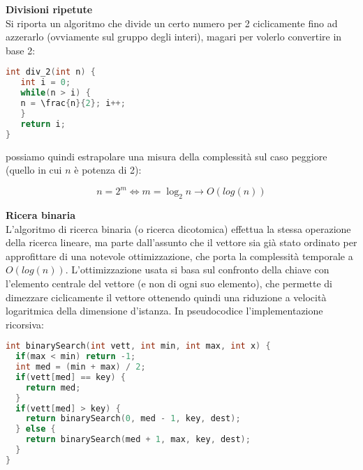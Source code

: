 \documentclass[a4paper,12pt]{article}
\begin{document}
\textbf{Divisioni ripetute} \\
Si riporta un algoritmo che divide un certo numero per 2 ciclicamente fino ad azzerarlo (ovviamente sul gruppo degli
interi), magari per volerlo convertire in base 2:
\begin{lstlisting}[language=C++]
int div_2(int n) {
   int i = 0;
   while(n > i) {
   n = \frac{n}{2}; i++;
   }
   return i;
}
\end{lstlisting}

possiamo quindi estrapolare una misura della complessità sul caso peggiore (quello in cui $n$ è potenza di 2):

$$ n = 2^m \Leftrightarrow m = \log_2{n} \rightarrow O(log(n)) $$

\textbf{Ricera binaria} \\
L'algoritmo di ricerca binaria (o ricerca dicotomica) effettua la stessa operazione della ricerca lineare, ma
parte dall'assunto che il vettore sia già stato ordinato per approfittare di una notevole ottimizzazione, che porta la complessità
temporale a $O(log(n))$. L'ottimizzazione usata si basa sul confronto della chiave con l'elemento centrale del vettore
(e non di ogni suo elemento), che permette di dimezzare ciclicamente il vettore ottenendo quindi una riduzione
a velocità logaritmica della dimensione d'istanza. In pseudocodice l'implementazione ricorsiva:

\begin{lstlisting}[language=C++]
int binarySearch(int vett, int min, int max, int x) {
  if(max < min) return -1;
  int med = (min + max) / 2;
  if(vett[med] == key) {
    return med;
  }
  if(vett[med] > key) {
    return binarySearch(0, med - 1, key, dest);
  } else {
    return binarySearch(med + 1, max, key, dest);
  }
}
\end{lstlisting}
\end{document}

